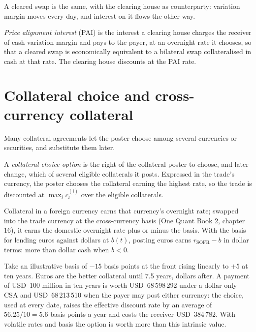 A cleared swap is the same, with the clearing house as counterparty: variation
margin moves every day, and interest on it flows the other way.

\begin{definition}\label{def:rc:multi-curve-and-collateral-discounting:pai}
\emph{Price alignment interest} (PAI) is the
interest a clearing house charges the receiver of cash variation margin and
pays to the payer, at an overnight rate it chooses, so that a cleared swap is
economically equivalent to a bilateral swap collateralised in cash at that
rate. The clearing house discounts at the PAI rate.
\end{definition}

\section{Collateral choice and cross-currency collateral}

Many collateral agreements let the poster choose among several currencies or
securities, and substitute them later.

\begin{definition}\label{def:rc:multi-curve-and-collateral-discounting:choice}
A \emph{collateral choice option} is the
right of the collateral poster to choose, and later change, which of several
eligible collaterals it posts. Expressed in the trade's currency, the poster
chooses the collateral earning the highest rate, so the trade is discounted at
$\max_i c^{(i)}_t$ over the eligible collaterals.
\end{definition}

Collateral in a foreign currency earns that currency's overnight rate; swapped
into the trade currency at the cross-currency basis (One Quant Book 2,
chapter 16), it earns the domestic overnight rate plus or minus the basis.
With the basis for lending euros against dollars at $b(t)$, posting euros
earns $r_{\text{SOFR}}-b$ in dollar terms: more than dollar cash when $b<0$.

\begin{example}\label{ex:rc:multi-curve-and-collateral-discounting:choice}
Take an illustrative basis of $-15$ basis points at the front rising linearly
to $+5$ at ten years. Euros are the better collateral until 7.5 years, dollars
after. A payment of USD~100 million in ten years is worth USD~68\,598\,292
under a dollar-only CSA and USD~68\,213\,510 when the payer may post either
currency: the choice, used at every date, raises the effective discount rate
by an average of $56.25/10 = 5.6$ basis points a year and costs the receiver
USD~384\,782. With volatile rates and basis the option is worth more than this
intrinsic value.
\end{example}

